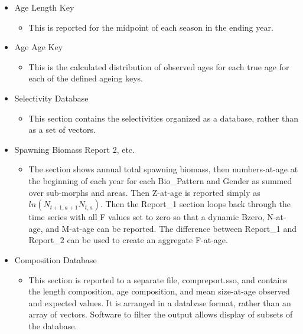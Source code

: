 \begin{itemize}
	\item Age Length Key
	\begin{itemize}
		\item This is reported for the midpoint of each season in the ending year.
	\end{itemize}
	\item Age Age Key
	\begin{itemize}
		\item This is the calculated distribution of observed ages for each true age for each of the defined ageing keys.
	\end{itemize}
	\item Selectivity Database
	\begin{itemize}
		\item This section contains the selectivities organized as a database, rather than as a set of vectors.
	\end{itemize}
	\item Spawning Biomass Report 2, etc.
	\begin{itemize}
		\item The section shows annual total spawning biomass, then numbers-at-age at the beginning of each year for each Bio\_Pattern and Gender as summed over sub-morphs and areas.  Then Z-at-age is reported simply as $ln(N_{t+1,a+1} N_{t,a})$.  Then the Report\_1 section loops back through the time series with all F values set to zero so that a dynamic Bzero, N-at-age, and M-at-age can be reported.  The difference between Report\_1 and Report\_2 can be used to create an aggregate F-at-age.
	\end{itemize}
	\item Composition Database
	\begin{itemize}
		\item This section is reported to a separate file, compreport.sso, and contains the length composition, age composition, and mean size-at-age observed and expected values.  It is arranged in a database format, rather than an array of vectors.  Software to filter the output allows display of subsets of the database.
	\end{itemize}
\end{itemize}
